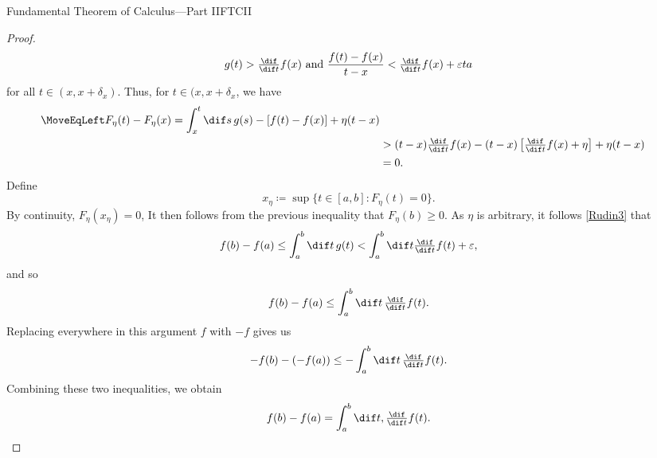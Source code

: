\begin{thm}{Fundamental Theorem of Calculus---Part II}{FTCII}
\begin{proof}
\begin{equation}
g(t)>\tfrac{\dif}{\dif t}f(x)\text{ and }\frac{f(t)-f(x)}{t-x}<\tfrac{\dif}{\dif t}f(x)+\varepsilon ta
\end{equation}
for all $t\in (x,x+\delta _x)$.  Thus, for $t\in (x,x+\delta _x$, we have
\begin{equation*}
\begin{split}
\MoveEqLeft
F_\eta (t)-F_\eta (x)=\int _x^t\dif s\, g(s)-[f(t)-f(x)]+\eta (t-x) \\
& >(t-x)\tfrac{\dif}{\dif t}f(x)-(t-x)\left[ \tfrac{\dif}{\dif t}f(x)+\eta \right] +\eta (t-x) \\
& =0.
\end{split}
\end{equation*}
Define
\begin{equation}
x_\eta \coloneqq \sup \{ t\in [a,b]:F_\eta (t)=0\} .
\end{equation}
By continuity, $F_\eta (x_\eta )=0$,   It then follows from the previous inequality that $F_\eta (b)\geq 0$.  As $\eta$ is arbitrary, it follows \eqref{Rudin3} that
\begin{equation}
f(b)-f(a)\leq \int _a^b\dif t\, g(t)<\int _a^b\dif t\tfrac{\dif}{\dif t}f(t)+\varepsilon ,
\end{equation}
and so
\begin{equation}
f(b)-f(a)\leq \int _a^b\dif t\, \tfrac{\dif}{\dif t}f(t).
\end{equation}
Replacing everywhere in this argument $f$ with $-f$ gives us
\begin{equation}
-f(b)-(-f(a))\leq -\int _a^b\dif t\, \tfrac{\dif}{\dif t}f(t).
\end{equation}
Combining these two inequalities, we obtain
\begin{equation}
f(b)-f(a)=\int _a^b\dif t, \tfrac{\dif}{\dif t}f(t).
\end{equation}
\end{proof}
\end{thm}

